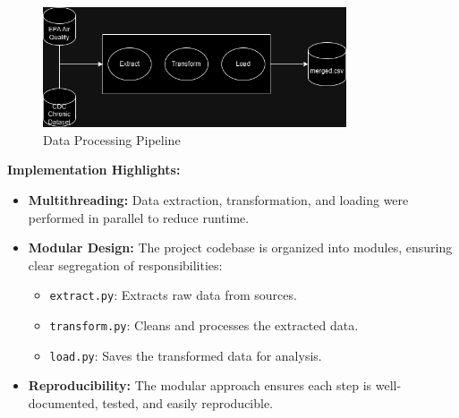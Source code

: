 \documentclass[11pt]{article}
\begin{document}
\begin{figure}[H]
    \centering
    \includegraphics[width=0.8\textwidth]{pipeline.png}
    \caption{Data Processing Pipeline}
\end{figure}

\textbf{Implementation Highlights:}
\begin{itemize}
    \item \textbf{Multithreading:} Data extraction, transformation, and loading were performed in parallel to reduce runtime.
    \item \textbf{Modular Design:} The project codebase is organized into modules, ensuring clear segregation of responsibilities:
    \begin{itemize}
        \item \texttt{extract.py}: Extracts raw data from sources.
        \item \texttt{transform.py}: Cleans and processes the extracted data.
        \item \texttt{load.py}: Saves the transformed data for analysis.
    \end{itemize}
    \item \textbf{Reproducibility:} The modular approach ensures each step is well-documented, tested, and easily reproducible.
\end{itemize}
\end{document}
